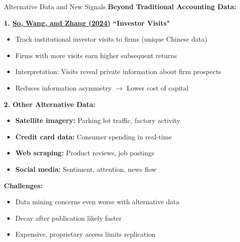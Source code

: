 \documentclass{beamer}
\begin{document}
\begin{frame}{Alternative Data and New Signals}
    \textbf{Beyond Traditional Accounting Data:}
    
    
    \textbf{1. \textcolor{blue}{\href{https://doi.org/10.1017/S0022109024000528}{So, Wang, and Zhang (2024)}} ``Investor Visits"}
    \begin{itemize}
        \item Track institutional investor visits to firms (unique Chinese data)
        \item Firms with more visits earn higher subsequent returns
        \item Interpretation: Visits reveal private information about firm prospects
        \item Reduces information asymmetry $\rightarrow$ Lower cost of capital
    \end{itemize}
    
    
    \textbf{2. Other Alternative Data:}
    \begin{itemize}
        \item \textbf{Satellite imagery:} Parking lot traffic, factory activity
        \item \textbf{Credit card data:} Consumer spending in real-time
        \item \textbf{Web scraping:} Product reviews, job postings
        \item \textbf{Social media:} Sentiment, attention, news flow
    \end{itemize}
    
    
    \textbf{Challenges:}
    \begin{itemize}
        \item Data mining concerns even worse with alternative data
        \item Decay after publication likely faster
        \item Expensive, proprietary access limits replication
    \end{itemize}
\end{frame}
\end{document}
